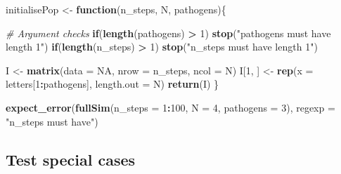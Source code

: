 \documentclass[
]{article}
\newenvironment{Shaded}{\begin{snugshade}}{\end{snugshade}}
\newcommand{\CommentTok}[1]{\textcolor[rgb]{0.56,0.35,0.01}{\textit{#1}}}
\newcommand{\ControlFlowTok}[1]{\textcolor[rgb]{0.13,0.29,0.53}{\textbf{#1}}}
\newcommand{\DataTypeTok}[1]{\textcolor[rgb]{0.13,0.29,0.53}{#1}}
\newcommand{\DecValTok}[1]{\textcolor[rgb]{0.00,0.00,0.81}{#1}}
\newcommand{\KeywordTok}[1]{\textcolor[rgb]{0.13,0.29,0.53}{\textbf{#1}}}
\newcommand{\NormalTok}[1]{#1}
\newcommand{\OperatorTok}[1]{\textcolor[rgb]{0.81,0.36,0.00}{\textbf{#1}}}
\newcommand{\OtherTok}[1]{\textcolor[rgb]{0.56,0.35,0.01}{#1}}
\newcommand{\StringTok}[1]{\textcolor[rgb]{0.31,0.60,0.02}{#1}}
\begin{document}
\begin{Shaded}
\begin{Highlighting}[]
\NormalTok{initialisePop <-}\StringTok{ }\ControlFlowTok{function}\NormalTok{(n_steps, N, pathogens)\{}
  
  \CommentTok{# Argument checks}
  \ControlFlowTok{if}\NormalTok{(}\KeywordTok{length}\NormalTok{(pathogens) }\OperatorTok{>}\StringTok{ }\DecValTok{1}\NormalTok{) }\KeywordTok{stop}\NormalTok{(}\StringTok{"pathogens must have length 1"}\NormalTok{)}
  \ControlFlowTok{if}\NormalTok{(}\KeywordTok{length}\NormalTok{(n_steps) }\OperatorTok{>}\StringTok{ }\DecValTok{1}\NormalTok{) }\KeywordTok{stop}\NormalTok{(}\StringTok{"n_steps must have length 1"}\NormalTok{)}

\NormalTok{  I <-}\StringTok{ }\KeywordTok{matrix}\NormalTok{(}\DataTypeTok{data =} \OtherTok{NA}\NormalTok{, }\DataTypeTok{nrow =}\NormalTok{ n_steps, }\DataTypeTok{ncol =}\NormalTok{ N)}
\NormalTok{  I[}\DecValTok{1}\NormalTok{, ] <-}\StringTok{ }\KeywordTok{rep}\NormalTok{(}\DataTypeTok{x =}\NormalTok{ letters[}\DecValTok{1}\OperatorTok{:}\NormalTok{pathogens], }\DataTypeTok{length.out =}\NormalTok{ N)}
  \KeywordTok{return}\NormalTok{(I)}
\NormalTok{\}}

\KeywordTok{expect_error}\NormalTok{(}\KeywordTok{fullSim}\NormalTok{(}\DataTypeTok{n_steps =} \DecValTok{1}\OperatorTok{:}\DecValTok{100}\NormalTok{, }\DataTypeTok{N =} \DecValTok{4}\NormalTok{, }\DataTypeTok{pathogens =} \DecValTok{3}\NormalTok{), }
             \DataTypeTok{regexp =} \StringTok{"n_steps must have"}\NormalTok{)}
\end{Highlighting}
\end{Shaded}

\hypertarget{corners}{%
\subsection*{Test special cases}\label{corners}}
\end{document}
